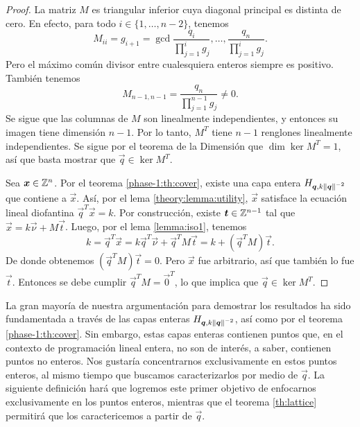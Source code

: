 \begin{proof}
	La matriz $M$ es triangular inferior cuya diagonal principal es distinta de cero. En efecto,
	para todo $i \in \lbrace 1, \ldots, n - 2\rbrace$, tenemos
	\begin{equation*}
		M_{ii} = g_{i + 1} = \gcd{\frac{q_i}{\prod_{j=1}^{i}g_j}, \ldots,
		\frac{q_n}{\prod_{j=1}^{i}g_j}}.
	\end{equation*}
	Pero el máximo común divisor entre cualesquiera enteros siempre es positivo. También tenemos
	\begin{equation*}
		M_{n-1, n-1} = \frac{q_n}{\prod_{j=1}^{n-1}g_j} \neq 0.
	\end{equation*}
	Se sigue que las columnas de $M$ son linealmente
	independientes, y entonces su imagen tiene dimensión $n - 1$. Por lo tanto, $M^T$ tiene $n - 1$
	renglones linealmente independientes. Se sigue por el teorema de la Dimensión que $\dim
	\ker{M^T} = 1$, así que basta mostrar que $\vec{q} \in \ker{M^T}$.

	Sea $\boldsymbol{x} \in \mathbb{Z}^n$. Por el teorema \ref{phase-1:th:cover}, existe una capa entera
	$H_{\boldsymbol{q}, k\left\lVert \boldsymbol{q} \right\rVert^{-2}}$ que contiene a $\vec{x}$. Así, por el lema
	\ref{theory:lemma:utility}, $\vec{x}$ satisface la
	ecuación lineal diofantina $\vec{q}^T\vec{x} = k$. Por construcción, existe $\boldsymbol{t} \in
	\mathbb{Z}^{n-1}$ tal que $\vec{x} = k\vec{\nu} + M\vec{t}$. Luego, por el lema \ref{lemma:iso1},
	tenemos
	\begin{equation*}
		k = \vec{q}^T\vec{x} = k \vec{q}^T\vec{\nu} + \vec{q}^TM\vec{t} = k +
		(\vec{q}^TM)\vec{t}.
	\end{equation*}
	De donde obtenemos $(\vec{q}^TM)\vec{t} = 0$. Pero $\vec{x}$ fue arbitrario, así que también lo
	fue $\vec{t}$. Entonces se debe cumplir $\vec{q}^TM = \vec{0}^T$, lo que implica que $\vec{q} \in
	\ker{M^T}$.
\end{proof}

La gran mayoría de nuestra argumentación para demostrar los resultados ha sido fundamentada a través
de las capas enteras $H_{\boldsymbol{q}, k\left\lVert \boldsymbol{q} \right\rVert^{-2}}$, así como por el teorema
\ref{phase-1:th:cover}. Sin embargo, estas capas enteras contienen puntos que, en el contexto de
programación lineal entera, no son de interés, a saber, contienen puntos no enteros. Nos gustaría
concentrarnos exclusivamente en estos puntos enteros, al mismo tiempo que buscamos caracterizarlos
por medio de $\vec{q}$. La siguiente definición hará que logremos este primer objetivo de enfocarnos
exclusivamente en los puntos enteros, mientras que el teorema \ref{th:lattice} permitirá que los
caractericemos a partir de $\vec{q}$.

